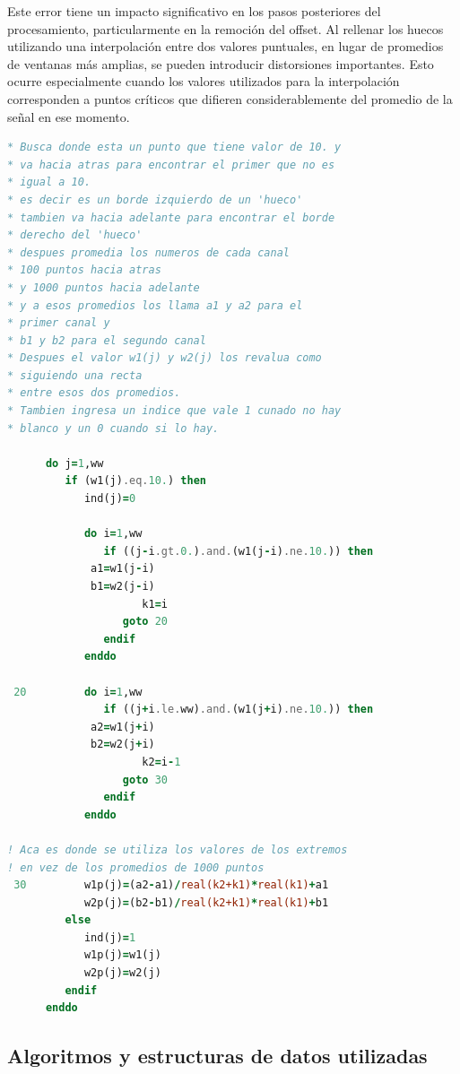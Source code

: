 \documentclass[12pt,a4paper]{article}
\begin{document}
Este error tiene un impacto significativo en los pasos posteriores del procesamiento, particularmente en la remoción del offset. Al rellenar los huecos utilizando una interpolación entre dos valores puntuales, en lugar de promedios de ventanas más amplias, se pueden introducir distorsiones importantes. Esto ocurre especialmente cuando los valores utilizados para la interpolación corresponden a puntos críticos que difieren considerablemente del promedio de la señal en ese momento.

\begin{lstlisting}[language=Fortran, label=lst:codigo_error]
* Busca donde esta un punto que tiene valor de 10. y 
* va hacia atras para encontrar el primer que no es
* igual a 10.
* es decir es un borde izquierdo de un 'hueco'
* tambien va hacia adelante para encontrar el borde
* derecho del 'hueco'
* despues promedia los numeros de cada canal
* 100 puntos hacia atras
* y 1000 puntos hacia adelante 
* y a esos promedios los llama a1 y a2 para el 
* primer canal y
* b1 y b2 para el segundo canal
* Despues el valor w1(j) y w2(j) los revalua como
* siguiendo una recta 
* entre esos dos promedios.
* Tambien ingresa un indice que vale 1 cunado no hay
* blanco y un 0 cuando si lo hay.

      do j=1,ww
         if (w1(j).eq.10.) then
            ind(j)=0
            
            do i=1,ww
               if ((j-i.gt.0.).and.(w1(j-i).ne.10.)) then
		     a1=w1(j-i)
		     b1=w2(j-i)                  
                     k1=i
                  goto 20
               endif
            enddo
            
 20         do i=1,ww  
               if ((j+i.le.ww).and.(w1(j+i).ne.10.)) then
		     a2=w1(j+i)
		     b2=w2(j+i)                  
                     k2=i-1
                  goto 30
               endif
            enddo

! Aca es donde se utiliza los valores de los extremos
! en vez de los promedios de 1000 puntos
 30         w1p(j)=(a2-a1)/real(k2+k1)*real(k1)+a1
            w2p(j)=(b2-b1)/real(k2+k1)*real(k1)+b1
         else
            ind(j)=1
            w1p(j)=w1(j)
            w2p(j)=w2(j)
         endif
      enddo
\end{lstlisting}

\subsection{Algoritmos y estructuras de datos utilizadas}
\lhead{}
\end{document}
